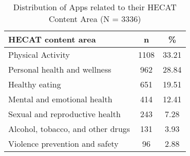 \begin{table}[!htb]
    \center
    \begin{tabular}{l | c | c}
        \textbf{HECAT content area} & \textbf{n} & \textbf{\%}\footnotemark \\
        \hline
        Physical Activity & 1108 & 33.21 \\
        \hline
        Personal health and wellness & 962 & 28.84 \\
        \hline
        Healthy eating & 651 & 19.51 \\
        \hline
        Mental and emotional health & 414 & 12.41 \\
        \hline
        Sexual and reproductive health & 243 & 7.28 \\
        \hline
        Alcohol, tobacco, and other drugs & 131 & 3.93 \\
        \hline
        Violence prevention and safety & 96 & 2.88 \\
    \end{tabular}
    \caption[Distribution of Apps related to their HECAT Content Area]{Distribution of Apps related to their HECAT Content Area (N = 3336)\footnotemark}
    \label{tab:HECAT}
\end{table}
\addtocounter{footnote}{-1}
\addtocounter{footnote}{1}

